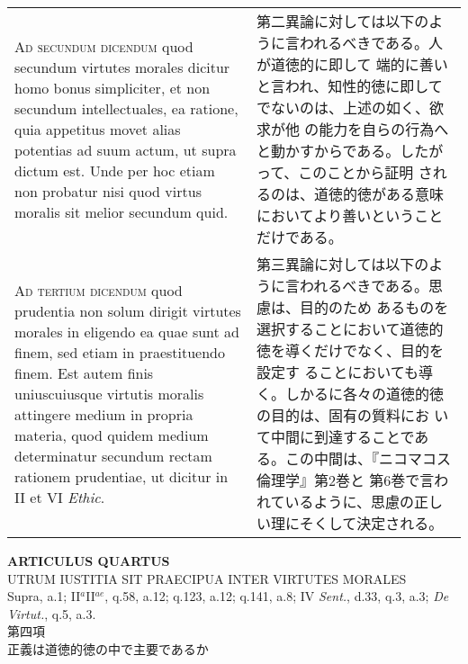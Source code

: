 \documentclass[10pt]{jsarticle}
\begin{document}
\begin{longtable}{p{21em}p{21em}}
\\



{\scshape Ad secundum dicendum} quod secundum virtutes morales dicitur
homo bonus simpliciter, et non secundum intellectuales, ea ratione,
quia appetitus movet alias potentias ad suum actum, ut supra dictum
est. Unde per hoc etiam non probatur nisi quod virtus moralis sit
melior secundum quid.


&

 第二異論に対しては以下のように言われるべきである。人が道徳的に即して
 端的に善いと言われ、知性的徳に即してでないのは、上述の如く、欲求が他
 の能力を自らの行為へと動かすからである。したがって、このことから証明
 されるのは、道徳的徳がある意味においてより善いということだけである。

\\


{\scshape Ad tertium dicendum} quod prudentia non solum dirigit
virtutes morales in eligendo ea quae sunt ad finem, sed etiam in
praestituendo finem. Est autem finis uniuscuiusque virtutis moralis
attingere medium in propria materia, quod quidem medium determinatur
secundum rectam rationem prudentiae, ut dicitur in II et VI {\itshape
Ethic}.

&

 第三異論に対しては以下のように言われるべきである。思慮は、目的のため
 あるものを選択することにおいて道徳的徳を導くだけでなく、目的を設定す
 ることにおいても導く。しかるに各々の道徳的徳の目的は、固有の質料にお
 いて中間に到達することである。この中間は、『ニコマコス倫理学』第2巻と
 第6巻で言われているように、思慮の正しい理にそくして決定される。

\end{longtable}
\newpage




\begin{center}
{\Large {\bf ARTICULUS QUARTUS}}\\
{\large UTRUM IUSTITIA SIT PRAECIPUA INTER VIRTUTES MORALES}\\
{\footnotesize Supra, a.1; II$^{a}$II$^{ae}$, q.58, a.12; q.123, a.12; q.141, a.8; IV {\itshape Sent.}, d.33, q.3, a.3; {\itshape De Virtut.}, q.5, a.3.}\\
{\Large 第四項\\正義は道徳的徳の中で主要であるか}
\end{center}
\end{document}
